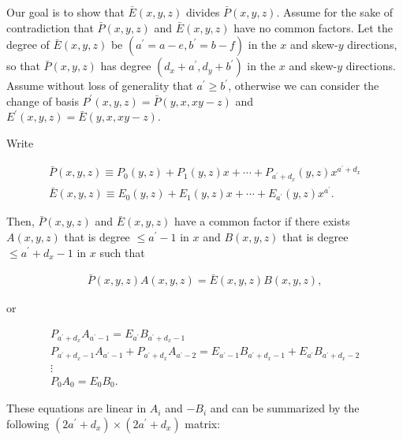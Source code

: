 Our goal is to show that $\bar{E}(x,y,z)$ divides $\bar{P}(x,y,z)$. Assume for the sake of contradiction that $\bar{P}(x,y,z)$ and $\bar{E}(x,y,z)$ have no common factors. Let the degree of $\bar{E}(x,y,z)$ be $(a^{\prime}=a-e,b^{\prime}=b-f)$ in the $x$ and skew-$y$ directions, so that $\bar{P}(x,y,z)$ has degree $(d_{x}+a^{\prime},d_{y}+b^{\prime})$ in the $x$ and skew-$y$ directions.
Assume without loss of generality that $a^{\prime}\geq b^{\prime}$, otherwise we can consider the change of basis $P^{\prime}(x,y,z)=\bar{P}(y,x,xy-z)$ and $E^{\prime}(x,y,z)=\bar{E}(y,x,xy-z)$.\par




Write\par


\[\begin{gathered}
\displaystyle\bar{P}(x,y,z) \displaystyle\equiv P_{0}(y,z)+P_{1}(y,z)x+\cdots+P_{a^{\prime}+d_{x}}(y,z)x^{a^{\prime}+d_{x}} \\
\displaystyle\bar{E}(x,y,z) \displaystyle\equiv E_{0}(y,z)+E_{1}(y,z)x+\cdots+E_{a^{\prime}}(y,z)x^{a^{\prime}}.
\end{gathered}\]


Then, $\bar{P}(x,y,z)$ and $\bar{E}(x,y,z)$ have a common factor if there exists $A(x,y,z)$ that is degree $\leq a^{\prime}-1$ in $x$ and $B(x,y,z)$ that is degree $\leq a^{\prime}+d_{x}-1$ in $x$ such that\par


\[\begin{gathered}
\bar{P}(x,y,z)A(x,y,z)=\bar{E}(x,y,z)B(x,y,z),
\end{gathered}\]


or\par


\[\begin{gathered}
\displaystyle P_{a^{\prime}+d_{x}}A_{a^{\prime}-1} \displaystyle=E_{a^{\prime}}B_{a^{\prime}+d_{x}-1} \\
\displaystyle P_{a^{\prime}+d_{x}-1}A_{a^{\prime}-1}+P_{a^{\prime}+d_{x}}A_{a^{\prime}-2} \displaystyle=E_{a^{\prime}-1}B_{a^{\prime}+d_{x}-1}+E_{a^{\prime}}B_{a^{\prime}+d_{x}-2} \\
\displaystyle\vdots \\
\displaystyle P_{0}A_{0} \displaystyle=E_{0}B_{0}.
\end{gathered}\]


These equations are linear in $A_{i}$ and $-B_{i}$ and can be summarized by the following $(2a^{\prime}+d_{x})\times(2a^{\prime}+d_{x})$ matrix:\par




